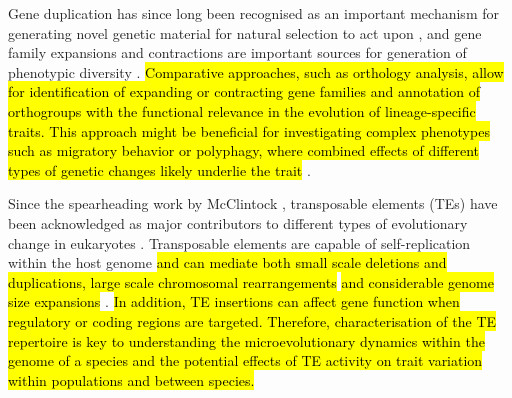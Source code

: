 \documentclass[twocolumn]{bmcart}%
\begin{document}
Gene duplication has since long been recognised as an important mechanism for generating novel genetic material for natural selection to act upon \cite{henikoffGeneFamiliesTaxonomy1997, ojeda-lopezEvolutionaryAnalysisMoringa2020, zhangDoesRecombinationShape2003}, and gene family expansions and contractions are important sources for generation of phenotypic diversity \cite{chenNewGenesDrivers2013a, kondrashovGeneDuplicationMechanism2012}. \hl{Comparative approaches, such as orthology analysis, allow for identification of expanding or contracting gene families and annotation of orthogroups with the functional relevance in the evolution of lineage-specific traits. This approach might be beneficial for investigating complex phenotypes such as migratory behavior or polyphagy, where combined effects of different types of genetic changes likely underlie the trait} \cite{schwanderSupergenesComplexPhenotypes2014}. 

Since the spearheading work by McClintock \cite{mcclintockControllingElementsGene1956}, transposable elements (TEs) have been acknowledged as major contributors to different types of evolutionary change in eukaryotes \cite{kazazianMobileElementsDrivers2004, kidwellTransposableElementsSources1997}. Transposable elements are capable of self-replication within the host genome \hl{and can mediate both small scale deletions and duplications, large scale chromosomal rearrangements} \cite{kidwellTransposableElementsSources1997} \hl{and considerable genome size expansions} \cite{podsiadlowskiGenomeAssemblyAnnotation2021, tallaRapidIncreaseGenome2017}. \hl{In addition, TE insertions can affect gene function when regulatory or coding regions are targeted. Therefore, characterisation of the TE repertoire is key to understanding the microevolutionary dynamics within the genome of a species and the potential effects of TE activity on trait variation within populations and between species.}
\end{document}
